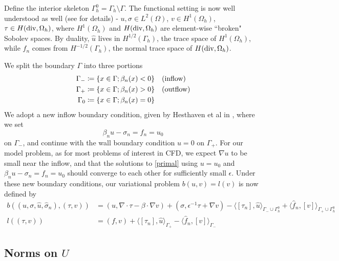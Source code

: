\documentclass[11pt,onecolumn]{scrartcl}
\newcommand{\grad}{\nabla}
\renewcommand{\div}{\grad \cdot}
\begin{document}
Define the interior skeleton $\Gamma_h^0 = \Gamma_h \setminus \Gamma$.  The functional setting is now well understood as well (see \cite{analysisDPG} for details) - $u,\sigma \in L^2(\Omega)$, $v \in H^1(\Omega_h)$, $\tau \in H({\rm div},\Omega_h)$, where $H^1(\Omega_h)$ and $H({\rm div},\Omega_h)$ are element-wise ``broken" Sobolev spaces.  By duality, $\widehat{u}$ lives in $H^{1/2}(\Gamma_h)$, the trace space of $H^1(\Omega_h)$, while $\widehat{f}_n$ comes from $H^{-1/2}(\Gamma_h)$, the normal trace space of $H({\rm div},\Omega_h)$.  

We split the boundary $\Gamma$ into three portions
\begin{align*}
\Gamma_{-} &\coloneqq \{x\in \Gamma; \beta_n(x) < 0\} \quad {\rm (inflow)}\\
\Gamma_{+} &\coloneqq \{x\in \Gamma; \beta_n(x) > 0\} \quad {\rm (outflow)}\\
\Gamma_{0} &\coloneqq \{x\in \Gamma; \beta_n(x) = 0\}
\end{align*}
We adopt a new inflow boundary condition, given by Hesthaven et al in \cite{Hesthaven96astable}, where we set
\[
\beta_n u - \sigma_n = f_n = u_0
\]
on $\Gamma_-$, and continue with the wall boundary condition $u=0$ on $\Gamma_+$.  For our model problem, as for most problems of interest in CFD, we expect $\grad u$ to be small near the inflow, and that the solutions to \eqref{primal} using $u=u_0$ and $\beta_n u - \sigma_n = f_n = u_0$ should converge to each other for sufficiently small $\epsilon$.  Under these new boundary conditions, our variational problem $b(u,v) = l(v)$ is now defined by
\begin{align*}
b\left(\left(u,\sigma, \widehat{u}, \widehat{\sigma}_n\right), \left(\tau, v\right)\right) &= \left(u,\div \tau - \beta \cdot \grad v\right) + \left(\sigma, \epsilon^{-1} \tau + \grad v\right) - \langle \left[\tau_n\right], \widehat{u} \rangle_{\Gamma_-\cup \Gamma_h^0} + \langle \widehat{f}_n, \left[v\right] \rangle_{\Gamma_+ \cup \Gamma_h^0} \\
l\left(\left(\tau,v\right)\right) &= \left(f, v\right) + \langle \left[\tau_n\right], \widehat{u} \rangle_{\Gamma_+} - \langle \widehat{f}_n, \left[v\right] \rangle_{\Gamma_-} 
\end{align*}

\subsection{Norms on $U$}
\end{document}
